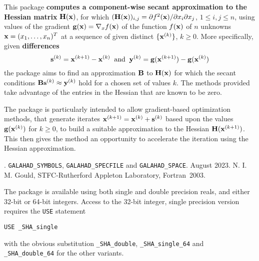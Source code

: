 \documentclass{galahad}
\newcommand{\packagename}{SHA}
\newcommand{\fullpackagename}{\libraryname\_\packagename}
\begin{document}
\galheader


\galsummary
This package 
{\bf computes a component-wise secant approximation to the Hessian matrix}
${\mathbf{H}}({\mathbf{x}})$, for which  
$({\mathbf{H}}({\mathbf{x}}))_{i,j} = \partial f^2 ({\mathbf{x}}) / \partial x_i \partial x_j$,
$1 \leq i, j \leq n$,  
using values of the gradient ${\mathbf{g}}({\mathbf{x}}) = \nabla_x f({\mathbf{x}})$ 
of the function $f({\mathbf{x}})$ of $n$ unknowns ${\mathbf{x}} = (x_1, \ldots, x_n)^T$
at a sequence of given distinct $\{{\mathbf{x}}^{(k)}\}$, $k \geq 0$.
More specifically, given {\bf differences}
\[ {\mathbf{s}}^{(k)} = {\mathbf{x}}^{(k+1)} - {\mathbf{x}}^{(k)} \;\;\mbox{and}\;\;
   {\mathbf{y}}^{(k)} = {\mathbf{g}}({\mathbf{x}}^{(k+1)}) - {\mathbf{g}}({\mathbf{x}}^{(k)})
\]
the package aims to find an approximation ${\mathbf{B}}$ to ${\mathbf{H}}({\mathbf{x}})$ for
which the secant conditions ${\mathbf{B}} {\mathbf{s}}^{(k)} \approx {\mathbf{y}}^{(k)}$ hold for
a chosen set of values $k$.
The methods provided take advantage of the entries in the Hessian that
are known to be zero.

The package is particularly intended to allow gradient-based
optimization methods, that generate iterates 
${\mathbf{x}}^{(k+1)} = {\mathbf{x}}^{(k)} + {\mathbf{s}}^{(k)}$ based upon the values ${\mathbf{g}}( {\mathbf{x}}^{(k)})$
for $k \geq 0$, to build a suitable approximation to the Hessian 
${\mathbf{H}}({\mathbf{x}}^{(k+1)})$. This then gives the method an opportunity to 
accelerate the iteration using the Hessian approximation.


\galattributes
\galversions{\tt  \fullpackagename\_single, \fullpackagename\_double}.
\galuses 
{\tt GALAHAD\_SY\-M\-BOLS}, 
{\tt GALAHAD\_SP\-ECFILE} and
{\tt GALAHAD\_SPACE}.
\galdate August 2023.
\galorigin N. I. M. Gould, STFC-Rutherford Appleton Laboratory,
\gallanguage Fortran~2003. 


\galhowto

The package is available using both single and double precision reals, 
and either 32-bit or 64-bit integers. Access to the 32-bit integer,
single precision version requires the {\tt USE} statement
\medskip

\hspace{8mm} {\tt USE \fullpackagename\_single}

\medskip
\noindent
with the obvious substitution {\tt \fullpackagename\_double},
{\tt \fullpackagename\_single\_64} and 
{\tt \fullpackagename\_double\_64} for the other variants.
\end{document}
